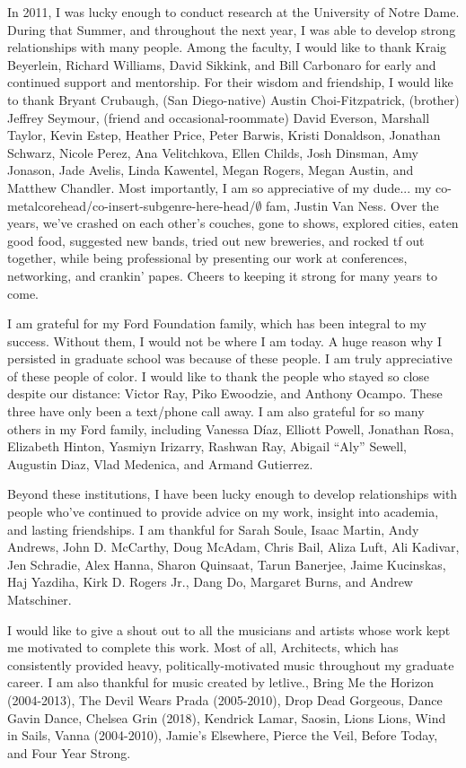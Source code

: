 {  In 2011, I was lucky enough to conduct research at the University of Notre Dame. During that Summer, and throughout the next year, I was able to develop strong relationships with many people. Among the faculty, I would like to thank Kraig Beyerlein, Richard Williams, David Sikkink, and Bill Carbonaro for early and continued support and mentorship. For their wisdom and friendship, I would like to thank Bryant Crubaugh, (San Diego-native) Austin Choi-Fitzpatrick, (brother) Jeffrey Seymour, (friend and occasional-roommate) David Everson, Marshall Taylor, Kevin Estep, Heather Price, Peter Barwis, Kristi Donaldson, Jonathan Schwarz, Nicole Perez, Ana Velitchkova, Ellen Childs, Josh Dinsman, Amy Jonason, Jade Avelis, Linda Kawentel, Megan Rogers, Megan Austin, and Matthew Chandler. Most importantly, I am so appreciative of my dude... my co-metalcorehead/co-insert-subgenre-here-head/$\emptyset$ fam, Justin Van Ness. Over the years, we've crashed on each other's couches, gone to shows, explored cities, eaten good food, suggested new bands, tried out new breweries, and rocked tf out together, while being professional by presenting our work at conferences, networking, and crankin' papes. Cheers to keeping it strong for many years to come.
  
I am grateful for my Ford Foundation family, which has been integral to my success. Without them, I would not be where I am today. A huge reason why I persisted in graduate school was because of these people. I am truly appreciative of these people of color. I would like to thank the people who stayed so close despite our distance: Victor Ray, Piko Ewoodzie, and Anthony Ocampo. These three have only been a text/phone call away. I am also grateful for so many others in my Ford family, including Vanessa D\'{i}az, Elliott Powell, Jonathan Rosa, Elizabeth Hinton, Yasmiyn Irizarry, Rashwan Ray, Abigail ``Aly'' Sewell, Augustin Diaz, Vlad Medenica, and Armand Gutierrez. 

  Beyond these institutions, I have been lucky enough to develop relationships with people who've continued to provide advice on my work, insight into academia, and lasting friendships. I am thankful for Sarah Soule, Isaac Martin, Andy Andrews, John D. McCarthy, Doug McAdam, Chris Bail, Aliza Luft, Ali Kadivar, Jen Schradie, Alex Hanna, Sharon Quinsaat, Tarun Banerjee, Jaime Kucinskas, Haj Yazdiha, Kirk D. Rogers Jr., Dang Do, Margaret Burns, and Andrew Matschiner. 
  
 I would like to give a shout out to all the musicians and artists whose work kept me motivated to complete this work. Most of all, Architects, which has consistently provided heavy, politically-motivated music throughout my graduate career. I am also thankful for music created by letlive., Bring Me the Horizon (2004-2013), The Devil Wears Prada (2005-2010), Drop Dead Gorgeous, Dance Gavin Dance, Chelsea Grin (2018), Kendrick Lamar, Saosin, Lions Lions, Wind in Sails, Vanna (2004-2010), Jamie's Elsewhere, Pierce the Veil, Before Today, and Four Year Strong. 
  
}
